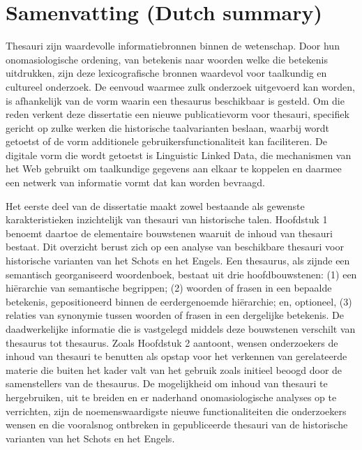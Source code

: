 
\section*{Samenvatting (Dutch summary)}


\bigskip

Thesauri zijn waardevolle informatiebronnen binnen de wetenschap. Door hun onomasiologische ordening, van betekenis naar woorden welke die betekenis uitdrukken, zijn deze lexicografische bronnen waardevol voor taalkundig en cultureel onderzoek. De eenvoud waarmee zulk onderzoek uitgevoerd kan worden, is afhankelijk van de vorm waarin een thesaurus beschikbaar is gesteld. Om die reden verkent deze dissertatie een nieuwe publicatievorm voor thesauri, specifiek gericht op zulke werken die historische taalvarianten beslaan, waarbij wordt getoetst of de vorm additionele gebruikersfunctionaliteit kan faciliteren. De digitale vorm die wordt getoetst is Linguistic Linked Data, die mechanismen van het Web gebruikt om taalkundige gegevens aan elkaar te koppelen en daarmee een netwerk van informatie vormt dat kan worden bevraagd. %

Het eerste deel van de dissertatie maakt zowel bestaande als gewenste karakteristieken inzichtelijk van thesauri van historische talen. 
Hoofdstuk 1 %
benoemt daartoe de elementaire bouwstenen waaruit de inhoud van thesauri bestaat. Dit overzicht berust zich op een analyse van beschikbare thesauri voor historische varianten van het Schots en het Engels. Een thesaurus, als zijnde een semantisch georganiseerd woordenboek, bestaat uit drie hoofdbouwstenen: (1) een hiërarchie van semantische begrippen; (2) woorden of frasen in een bepaalde betekenis, gepositioneerd binnen de eerdergenoemde hiërarchie; en, optioneel, (3) relaties van synonymie tussen woorden of frasen in een dergelijke betekenis. De daadwerkelijke informatie die is vastgelegd middels deze bouwstenen verschilt van thesaurus tot thesaurus. Zoals Hoofdstuk 2 aantoont, wensen onderzoekers de inhoud van thesauri te benutten als opstap voor het verkennen van gerelateerde materie die buiten het kader valt van het gebruik zoals initieel beoogd door de samenstellers van de thesaurus. De mogelijkheid om inhoud van thesauri te hergebruiken, uit te breiden en er naderhand onomasiologische analyses op te verrichten, zijn de noemenswaardigste nieuwe functionaliteiten die onderzoekers wensen en die vooralsnog ontbreken in gepubliceerde thesauri van de historische varianten van het Schots en het Engels.

